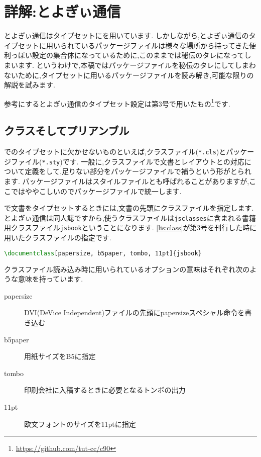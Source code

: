 \newcommand*{\reflisting}[1]{\lstlistingname\ref{#1}}
\renewcommand*\descriptionlabel[1]{\normalfont\headfont #1 :\hfil}

\chapter{詳解:とよぎぃ通信}

とよぎぃ通信はタイプセットに{\pLaTeX}を用いています.
しかしながら,とよぎぃ通信のタイプセットに用いられているパッケージファイルは様々な場所から持ってきた便利っぽい設定の集合体になっているために,このままでは秘伝のタレになってしまいます.
というわけで,本稿ではパッケージファイルを秘伝のタレにしてしまわないために,タイプセットに用いるパッケージファイルを読み解き,可能な限りの解説を試みます.

参考にするとよぎぃ通信のタイプセット設定は第3号で用いたもの\footnote{\url{https://github.com/tut-cc/c90}}です.

\section{クラスそしてプリアンブル}

{\pLaTeX}でのタイプセットに欠かせないものといえば,クラスファイル(\texttt{*.cls})とパッケージファイル(\texttt{*.sty})です.
一般に,クラスファイルで文書とレイアウトとの対応について定義をして,足りない部分をパッケージファイルで補うという形がとられます.
パッケージファイルはスタイルファイルとも呼ばれることがありますが,ここではややこしいのでパッケージファイルで統一します.

{\pLaTeX}で文書をタイプセットするときには,文書の先頭にクラスファイルを指定します.
とよぎぃ通信は同人誌ですから,使うクラスファイルは\texttt{jsclasses}に含まれる書籍用クラスファイル\texttt{jsbook}ということになります.
\reflisting{lis:class}が第3号を刊行した時に用いたクラスファイルの指定です.
\begin{lstlisting}[caption=クラスファイルの指定,label=lis:class,language=tex]
\documentclass[papersize, b5paper, tombo, 11pt]{jsbook}
\end{lstlisting}
クラスファイル読み込み時に用いられているオプションの意味はそれぞれ次のような意味を持っています.
\begin{description}
	\item[papersize] DVI(DeVice Independent)ファイルの先頭にpapersizeスペシャル命令を書き込む
	\item[b5paper] 用紙サイズをB5に指定
	\item[tombo] 印刷会社に入稿するときに必要となるトンボの出力
	\item[11pt] 欧文フォントのサイズを11ptに指定
\end{description}

